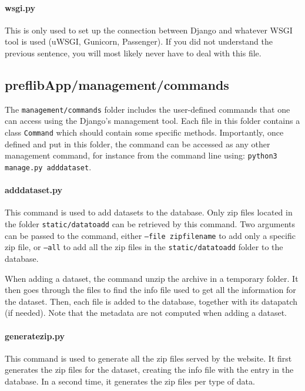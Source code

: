 \documentclass{report}
\begin{document}
	\paragraph*{\faFileO{} wsgi.py} This is only used to set up the connection between Django and whatever WSGI tool is used (uWSGI, Gunicorn, Passenger). If you did not understand the previous sentence, you will most likely never have to deal with this file.
	
	\subsection*{\faFolderO{} preflibApp/management/commands}
	
	The \texttt{management/commands} folder includes the user-defined commands that one can access using the Django's management tool. Each file in this folder contains a class \texttt{Command} which should contain some specific methods. Importantly, once defined and put in this folder, the command can be accessed as any other management command, for instance from the command line using: \texttt{python3 manage.py adddataset}.
	
	\paragraph*{\faFileO{} adddataset.py} This command is used to add datasets to the database. Only zip files located in the folder \texttt{static/datatoadd} can be retrieved by this command. Two arguments can be passed to the command, either \texttt{--file zipfilename} to add only a specific zip file, or \texttt{--all} to add all the zip files in the \texttt{static/datatoadd} folder to the database.
	
	When adding a dataset, the command unzip the archive in a temporary folder. It then goes through the files to find the info file used to get all the information for the dataset. Then, each file is added to the database, together with its datapatch (if needed). Note that the metadata are not computed when adding a dataset. 
	
	\paragraph*{\faFileO{} generatezip.py} This command is used to generate all the zip files served by the website. It first generates the zip files for the dataset, creating the info file with the entry in the database. In a second time, it generates the zip files per type of data.
	
\end{document}

